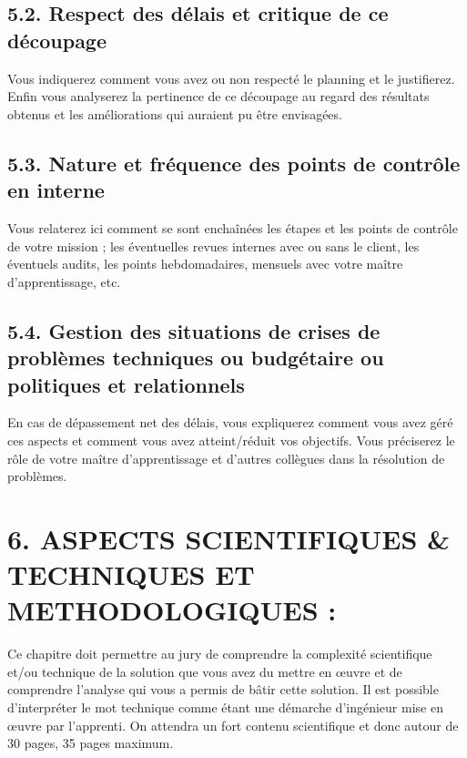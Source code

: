 \documentclass[a4paper, 12pt]{article}
\begin{document}
    
    \newpage{}
    
\subsection{5.2. Respect des délais et critique de ce découpage}

Vous indiquerez comment vous avez ou non respecté le planning et le justifierez. Enfin vous
analyserez la pertinence de ce découpage au regard des résultats obtenus et les améliorations
qui auraient pu être envisagées.

    
    \newpage{}
    
\subsection{5.3. Nature et fréquence des points de contrôle en interne}

Vous relaterez ici comment se sont enchaînées les étapes et les points de contrôle de votre
mission ; les éventuelles revues internes avec ou sans le client, les éventuels audits, les points
hebdomadaires, mensuels avec votre maître d’apprentissage, etc.

    
    \newpage{}
    
\subsection{5.4. Gestion des situations de crises de problèmes techniques ou budgétaire ou politiques et relationnels}

En cas de dépassement net des délais, vous expliquerez comment vous avez géré ces aspects
et comment vous avez atteint/réduit vos objectifs. Vous préciserez le rôle de votre maître
d’apprentissage et d’autres collègues dans la résolution de problèmes.

    
    \newpage{}
    
\newpage{}
\section{6. ASPECTS SCIENTIFIQUES \& TECHNIQUES ET METHODOLOGIQUES :}

Ce chapitre doit permettre au jury de comprendre la complexité scientifique et/ou technique de la
solution que vous avez du mettre en œuvre et de comprendre l’analyse qui vous a permis de bâtir cette
solution. Il est possible d’interpréter le mot technique comme étant une démarche d’ingénieur mise
en œuvre par l’apprenti.
On attendra un fort contenu scientifique et donc autour de 30 pages, 35 pages maximum.
\end{document}
